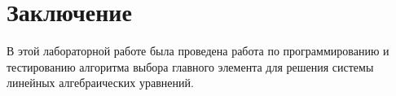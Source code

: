 \section{Заключение}
    В этой лабораторной работе была проведена работа по программированию и тестированию алгоритма выбора главного элемента для решения системы линейных алгебраических уравнений.
